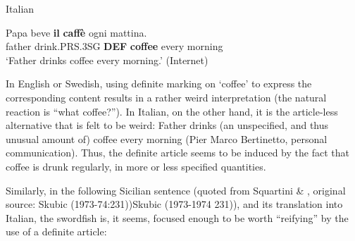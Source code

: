\item 

Italian



 \ea\label{}
\gll Papa  beve  \textbf{il} \textbf{caffè} ogni  mattina.\\


father  drink.PRS.3SG  \textbf{DEF} \textbf{coffee} every  morning\\

\glt ‘Father drinks coffee every morning.’ (Internet)

\z

In English or Swedish, using definite marking on ‘coffee’ to express the corresponding content results in a rather weird interpretation (the natural reaction is “what coffee?”). In Italian, on the other hand, it is the article-less alternative that is felt to be weird: Father drinks (an unspecified, and thus unusual amount of) coffee every morning (Pier Marco Bertinetto, personal communication). Thus, the definite article seems to be induced by the fact that coffee is drunk regularly, in more or less specified quantities. 


Similarly, in the following Sicilian sentence (quoted from Squartini \& \citet[413]{Bertinetto2000}, original source: Skubic (1973-74:231))Skubic (1973-1974 231)), and its translation into Italian, the swordfish is, it seems, focused enough to be worth “reifying” by the use of a definite article:


\item 


\item 

